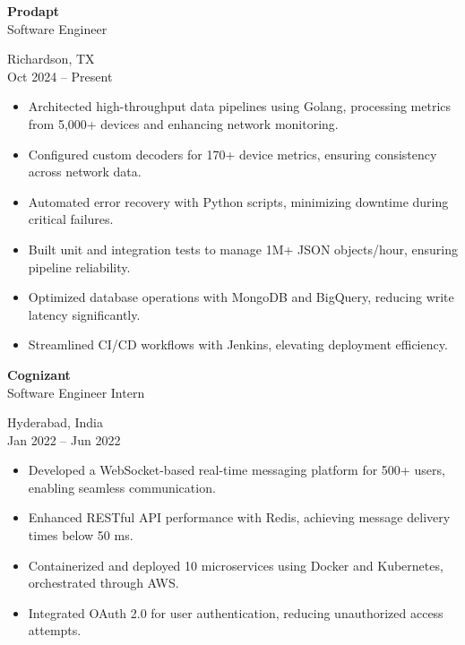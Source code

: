 \documentclass[10pt,a4paper]{article}
\newcommand{\dateplace}[2]{\raggedleft #1 \\ #2 \par}
\newcommand{\role}[2]{\raggedright \textbf{#1} \\ #2 \par}
\begin{document}
\begin{minipage}[t]{0.70\textwidth}
    \role{Prodapt}{Software Engineer}
\end{minipage}
\begin{minipage}[t]{0.29\textwidth}
    \dateplace{Richardson, TX}{Oct 2024 -- Present}
\end{minipage}
\vspace{0em}
\begin{itemize}

    \item Architected high-throughput data pipelines using Golang, processing metrics from 5,000+ devices and enhancing network monitoring.
    \item Configured custom decoders for 170+ device metrics, ensuring consistency across network data.
    \item Automated error recovery with Python scripts, minimizing downtime during critical failures.
    \item Built unit and integration tests to manage 1M+ JSON objects/hour, ensuring pipeline reliability.
    \item Optimized database operations with MongoDB and BigQuery, reducing write latency significantly.
    \item Streamlined CI/CD workflows with Jenkins, elevating deployment efficiency.
\end{itemize}
\vspace{0.5em}


\begin{minipage}[t]{0.70\textwidth}
    \role{Cognizant}{Software Engineer Intern}
\end{minipage}
\begin{minipage}[t]{0.29\textwidth}
    \dateplace{Hyderabad, India}{Jan 2022 -- Jun 2022}
\end{minipage}
\vspace{0em}
\begin{itemize}

    \item Developed a WebSocket-based real-time messaging platform for 500+ users, enabling seamless communication.
    \item Enhanced RESTful API performance with Redis, achieving message delivery times below 50 ms.
    \item Containerized and deployed 10 microservices using Docker and Kubernetes, orchestrated through AWS.
    \item Integrated OAuth 2.0 for user authentication, reducing unauthorized access attempts.
\end{itemize}
\vspace{0.5em}
\end{document}

